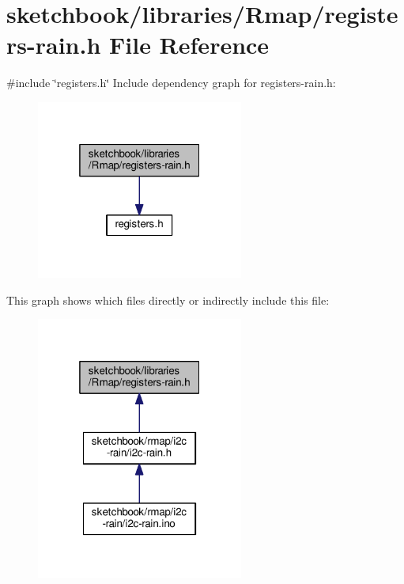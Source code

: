 \hypertarget{registers-rain_8h}{}\section{sketchbook/libraries/\+Rmap/registers-\/rain.h File Reference}
\label{registers-rain_8h}
{\ttfamily \#include \char`\"{}registers.\+h\char`\"{}}\newline
Include dependency graph for registers-\/rain.h\+:\nopagebreak
\begin{figure}[H]
\begin{center}
\leavevmode
\includegraphics[width=193pt]{registers-rain_8h__incl}
\end{center}
\end{figure}
This graph shows which files directly or indirectly include this file\+:\nopagebreak
\begin{figure}[H]
\begin{center}
\leavevmode
\includegraphics[width=193pt]{registers-rain_8h__dep__incl}
\end{center}
\end{figure}
